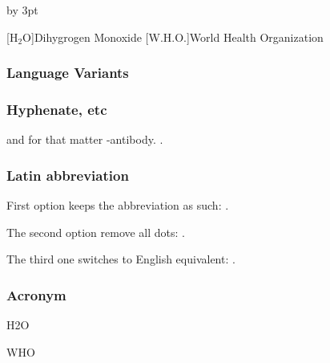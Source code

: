 \documentclass[a4paper]{article}
\begin{document}
\parindent 0pt
\parskip 12pt
\advance\baselineskip by 3pt

[$\mathrm{H_2O}$]{Dihygrogen Monoxide}
[W.H.O.]{World Health Organization}

\subsubsection*{Language Variants}

\lipsum[1]










\subsubsection*{Hyphenate, etc}

 and for that matter \hyp{anti}{body}.
.

\subsubsection*{Latin abbreviation}


First option keeps the abbreviation as such: 
 . 

The second option remove all dots: 
 . 

The third one switches to English equivalent: 
 .

\subsubsection*{Acronym}

\ac{H2O} 

\ac{WHO}

\lipsum[2]
\end{document}
